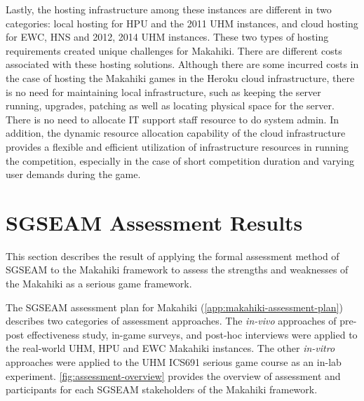 Lastly, the hosting infrastructure among these instances are different in two categories: local hosting for HPU and the 2011 UHM instances, and cloud hosting for EWC, HNS and 2012, 2014 UHM instances. These two types of hosting requirements created unique challenges for Makahiki. There are different costs associated with these hosting solutions. Although there are some incurred costs in the case of hosting the Makahiki games in the Heroku cloud infrastructure, there is no need for maintaining local infrastructure, such as keeping the server running, upgrades, patching as well as locating physical space for the server. There is no need to allocate IT support staff resource to do system admin. In addition, the dynamic resource allocation capability of the cloud infrastructure provides a flexible and efficient utilization of infrastructure resources in running the competition, especially in the case of short competition duration and varying user demands during the game.

\section{SGSEAM Assessment Results}
\label{sec:assessment-result}

This section describes the result of applying the formal assessment method of SGSEAM to the Makahiki framework to assess the strengths and weaknesses of the Makahiki as a serious game framework.

The SGSEAM assessment plan for Makahiki (\autoref{app:makahiki-assessment-plan}) describes two categories of assessment approaches. The {\em in-vivo} approaches of pre-post effectiveness study, in-game surveys, and post-hoc interviews were applied to the real-world UHM, HPU and EWC Makahiki instances. The other {\em in-vitro} approaches were applied to the UHM ICS691 serious game course as an in-lab experiment.  \autoref{fig:assessment-overview} provides the overview of assessment and participants for each SGSEAM stakeholders of the Makahiki framework. 

